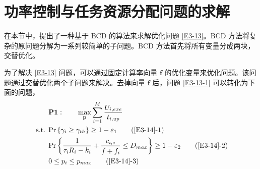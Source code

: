 \section{功率控制与任务资源分配问题的求解}\label{section3-3}
在本节中，提出了一种基于 BCD 的算法来求解优化问题 \eqref{E3-13}。BCD 方法将复杂的原问题分解为一系列较简单的子问题。BCD 方法首先将所有变量分成两块，交替优化。

为了解决 \eqref{E3-13} 问题，可以通过固定计算率向量 $\mathbf{f}$ 的优化变量来优化问题。该问题通过交替优化两个子问题来解决。去掉向量 $\mathbf{f}$ 后，问题 \eqref{E3-13-1} 可以转化为下面的问题，
\begin{align}
& \textbf{P1}:\qquad\max\limits_{\mathbf{p}}\sum_{i=1}^{M}\frac{U_{i,exe}}{t_{i,up}}                                  \label{E3-14}\\
\text { s.t. }
& \textrm{Pr}\left\{\gamma_i\geq\gamma_{th}\right\}\geq1-\varepsilon_1                                         \tag{\ref{E3-14}{-1}}      \label{E3-14-1}\\  %
& \textrm{Pr}\left\{\frac{1}{\tau_iR_i-k_i}+\frac{c_{i,e}}{\bar{f}+f_i}\le D_{max}\right\}\geq1-\varepsilon_2  \tag{\ref{E3-14}{-2}}      \label{E3-14-2}\\  %
& 0\le p_i\le p_{max}                                                                                          \tag{\ref{E3-14}{-3}}      \label{E3-14-3}  %
\end{align}
